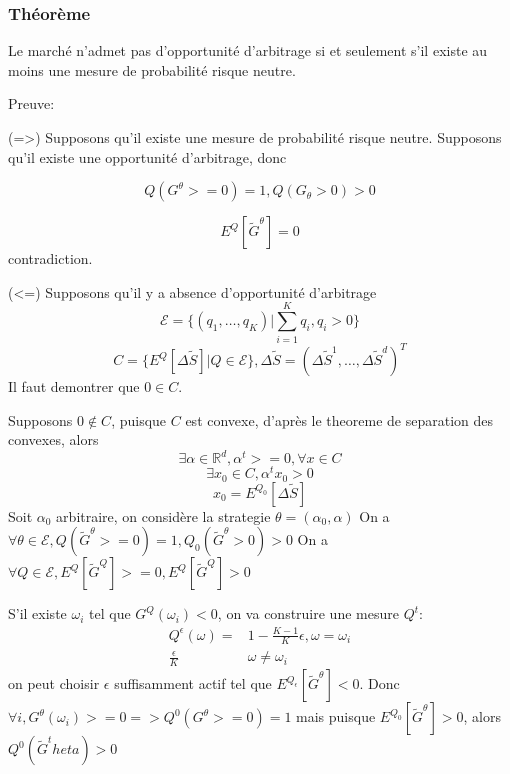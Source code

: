 \documentclass{article}
\begin{document}
\subsubsection{Th\'eor\`eme}
Le march\'e n'admet pas d'opportunit\'e d'arbitrage si et seulement s'il existe au moins une mesure de probabilit\'e risque neutre.

Preuve:

(=>) Supposons qu'il existe une mesure de probabilit\'e risque neutre. Supposons qu'il existe une opportunit\'e d'arbitrage, donc 

\begin{equation}
Q(G^\theta>=0)=1, Q(G_\theta>0)>0
\end{equation}

\begin{equation}
E^Q[\tilde{G}^\theta]=0
\end{equation}
contradiction.

(<=) Supposons qu'il y a absence d'opportunit\'e d'arbitrage
\begin{equation}
\mathcal{E}=\{(q_1,\ldots,q_K)|\sum_{i=1}^K q_i, q_i>0\}
\end{equation}
\begin{equation}
C=\{E^Q[\Delta\tilde{S}]|Q\in\mathcal{E}\}, \Delta \tilde{S}=(\Delta \tilde{S}^1,\ldots, \Delta\tilde{S}^d)^T
\end{equation}
Il faut demontrer que $0\in C$.

Supposons $0\notin C$, puisque $C$ est convexe, d'apr\`es le theoreme de separation des convexes, alors 
\begin{equation}
\exists \alpha \in \mathbb{R}^d, \alpha^t >= 0, \forall x\in C
\end{equation}
\begin{equation}
\exists x_0\in C, \alpha^t x_0 > 0
\end{equation}
\begin{equation}
x_0=E^{Q_0}[\Delta\tilde{S}]
\end{equation}
Soit $\alpha_0$ arbitraire, on consid\`ere la strategie $\theta=(\alpha_0, \alpha)$
On a $\forall \theta\in\mathcal{E}, Q(\tilde{G}^\theta>=0)=1, Q_0(\tilde{G}^\theta>0)>0$
On a $\forall Q\in\mathcal{E}, E^Q[\tilde{G}^Q]>=0, E^Q[\tilde{G}^Q]>0$

S'il existe $\omega_i$ tel que $G^Q(\omega_i)<0$, on va construire une mesure $Q^t$:
\begin{equation}
\begin{split}
	Q^\epsilon(\omega)= & 1-\frac{K-1}{K}\epsilon , \omega = \omega_i \\
	\frac{\epsilon}{K} & \omega\neq \omega_i
\end{split}
\end{equation}
on peut choisir $\epsilon$ suffisamment actif tel que $E^{Q_\epsilon}[\tilde{G}^{\theta}]<0$. Donc $\forall i, G^\theta(\omega_i)>=0 => Q^0(G^\theta>=0)=1$ mais puisque $E^{Q_0}[\tilde{G}^\theta]>0$, alors $Q^0(\tilde{G}^theta)>0$
\end{document}
